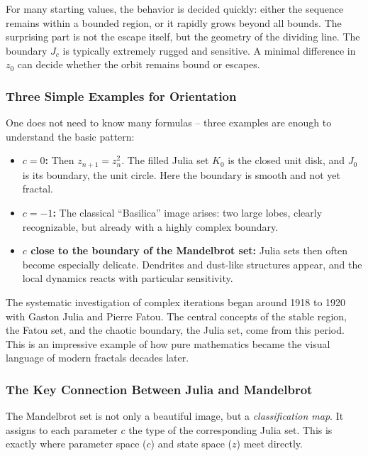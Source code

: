 For many starting values, the behavior is decided quickly:
either the sequence remains within a bounded region,
or it rapidly grows beyond all bounds.
The surprising part is not the escape itself,
but the geometry of the dividing line.
The boundary \(J_c\) is typically extremely rugged and sensitive.
A minimal difference in \(z_0\)
can decide
whether the orbit remains bound or escapes.

\subsubsection*{Three Simple Examples for Orientation}

One does not need to know many formulas --
three examples are enough to understand the basic pattern:

\begin{itemize}
	\item \textbf{\(c=0\):} Then \(z_{n+1}=z_n^2\).
	The filled Julia set \(K_0\) is the closed unit disk,
	and \(J_0\) is its boundary, the unit circle.
	Here the boundary is smooth and not yet fractal.
	\item \textbf{\(c=-1\):} The classical ``Basilica'' image arises:
	two large lobes, clearly recognizable,
	but already with a highly complex boundary.
	\item \textbf{\(c\) close to the boundary of the Mandelbrot set:} Julia sets then often become especially delicate.
	Dendrites and dust-like structures appear,
	and the local dynamics reacts with particular sensitivity.
\end{itemize}

\begin{HistoryBox}
	\label{box:julia}
	The systematic investigation of complex iterations began around 1918 to 1920 with Gaston Julia and Pierre Fatou.
	The central concepts of the stable region, the Fatou set, and the chaotic boundary, the Julia set, come from this period.
	This is an impressive example of how pure mathematics became the visual language of modern fractals decades later.
\end{HistoryBox}

\subsubsection*{The Key Connection Between Julia and Mandelbrot}

The Mandelbrot set is not only a beautiful image,
but a \emph{classification map}.
It assigns to each parameter \(c\)
the type of the corresponding Julia set.
This is exactly where parameter space (\(c\))
and state space (\(z\)) meet directly.

